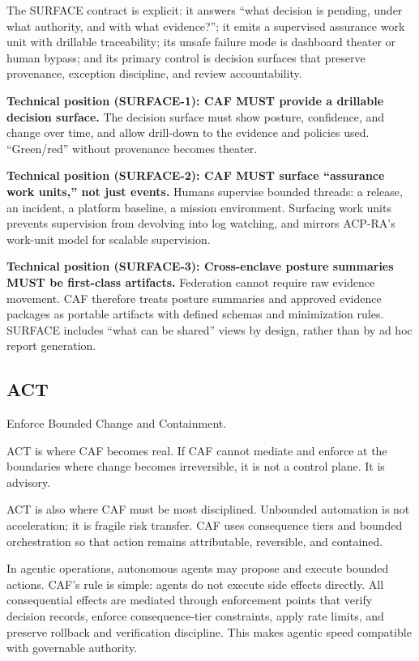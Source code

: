 \documentclass[11pt]{article}
\begin{document}
The SURFACE contract is explicit: it answers ``what decision is pending, under what authority, and with what evidence?''; it emits a supervised assurance work unit with drillable traceability; its unsafe failure mode is dashboard theater or human bypass; and its primary control is decision surfaces that preserve provenance, exception discipline, and review accountability.

\textbf{Technical position (SURFACE-1): CAF MUST provide a drillable
decision surface.} The decision surface must show posture, confidence,
and change over time, and allow drill-down to the evidence and policies
used. ``Green/red'' without provenance becomes theater.

\textbf{Technical position (SURFACE-2): CAF MUST surface ``assurance
work units,'' not just events.} Humans supervise bounded threads: a
release, an incident, a platform baseline, a mission environment.
Surfacing work units prevents supervision from devolving into log
watching, and mirrors ACP-RA's work-unit model for scalable supervision.
\cite{ACPRA}

\textbf{Technical position (SURFACE-3): Cross-enclave posture summaries
MUST be first-class artifacts.} Federation cannot require raw evidence
movement. CAF therefore treats posture summaries and approved evidence
packages as portable artifacts with defined schemas and minimization
rules. SURFACE includes ``what can be shared'' views by design, rather
than by ad hoc report generation.

\hypertarget{act}{%
\subsection{ACT}\label{act}}

\begin{calloutquote}
Enforce Bounded Change and Containment.
\end{calloutquote}

ACT is where CAF becomes real. If CAF cannot mediate and enforce at the
boundaries where change becomes irreversible, it is not a control plane.
It is advisory.

ACT is also where CAF must be most disciplined. Unbounded automation is
not acceleration; it is fragile risk transfer. CAF uses consequence
tiers and bounded orchestration so that action remains attributable,
reversible, and contained.

In agentic operations, autonomous agents may propose and execute bounded actions. CAF's rule is simple: agents do not execute side effects directly. All consequential effects are mediated through enforcement points that verify decision records, enforce consequence-tier constraints, apply rate limits, and preserve rollback and verification discipline. This makes agentic speed compatible with governable authority.
\end{document}
